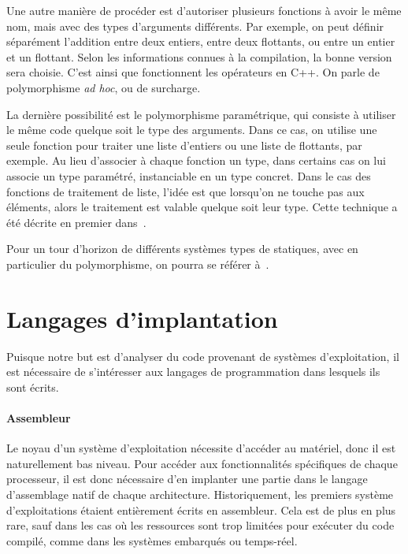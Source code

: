 Une autre manière de procéder est d'autoriser plusieurs fonctions à avoir le
même nom, mais avec des types d'arguments différents. Par exemple, on peut
définir séparément l'addition entre deux entiers, entre deux flottants, ou entre
un entier et un flottant. Selon les informations connues à la compilation, la
bonne version sera choisie. C'est ainsi que fonctionnent les opérateurs en C++.
On parle de polymorphisme \emph{ad hoc}, ou de surcharge.

La dernière possibilité est le polymorphisme paramétrique, qui consiste à
utiliser le \linebreak même code quelque soit le type des arguments. Dans ce
cas, on utilise une seule fonction pour traiter une liste d'entiers ou une liste
de flottants, par exemple. Au lieu d'associer à chaque fonction un type, dans
certains cas on lui associe un type paramétré, instanciable en un type concret.
Dans le cas des fonctions de traitement de liste, l'idée est que lorsqu'on ne
touche pas aux éléments, alors le traitement est valable quelque soit leur type.
Cette technique a été décrite en premier dans~\cite{Milner78}.

Pour un tour d'horizon de différents systèmes types de statiques, avec en
particulier du polymorphisme, on pourra se référer à~\cite{TAPL}.

\section{Langages d'implantation}

Puisque notre but est d'analyser du code provenant de systèmes d'exploitation,
il est nécessaire de s'intéresser aux langages de programmation dans lesquels
ils sont écrits.

\paragraph{Assembleur}

Le noyau d'un système d'exploitation nécessite d'accéder au matériel, donc il
est naturellement bas niveau. Pour accéder aux fonctionnalités spécifiques de
chaque processeur, il est donc nécessaire d'en implanter une partie dans le
langage d'assemblage natif de chaque architecture. Historiquement, les premiers
système d'exploitations étaient entièrement écrits en assembleur. Cela est de
plus en plus rare, sauf dans les cas où les ressources sont trop limitées pour
exécuter du code compilé, comme dans les systèmes embarqués ou temps-réel.

